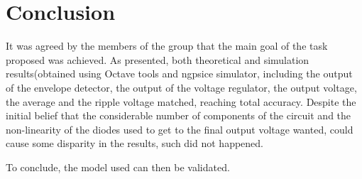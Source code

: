 \pagebreak
\section{Conclusion}
\label{con}

\par It was agreed by the members of the group that the main goal of the task proposed was achieved. As presented, both theoretical and simulation results(obtained using Octave tools and ngpsice simulator, including the output of the envelope detector, the output of the voltage regulator, the output voltage, the average and the ripple voltage matched, reaching total accuracy. Despite the initial belief that the considerable number of components of the circuit and the non-linearity of the diodes used to get to the final output voltage wanted, could cause some disparity in the results, such did not happened.
\par To conclude, the model used can then be validated.
